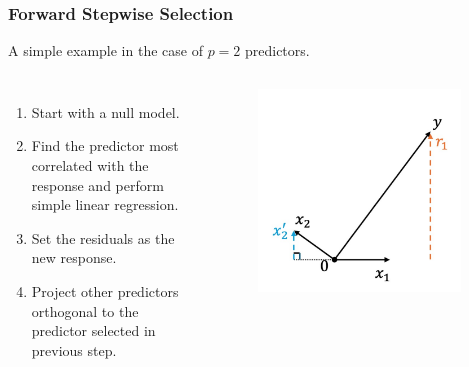 \begin{frame}
\frametitle{Forward Stepwise Selection}
A simple example in the case of $p=2$ predictors.

\begin{columns}
    \begin{enumerate}
        \item Start with a null model.
        \item Find the predictor most correlated with the response and perform simple linear regression.
        \item Set the residuals as the new response.
        \item Project other predictors orthogonal to the predictor selected in previous step.
    \end{enumerate}
    
    \begin{figure}[!htbp]
        \begin{center}
            \includegraphics[width=0.95\textwidth]{img/FStepR/4.jpeg}
        \end{center}
    \end{figure}
    \end{columns}
\end{frame}

